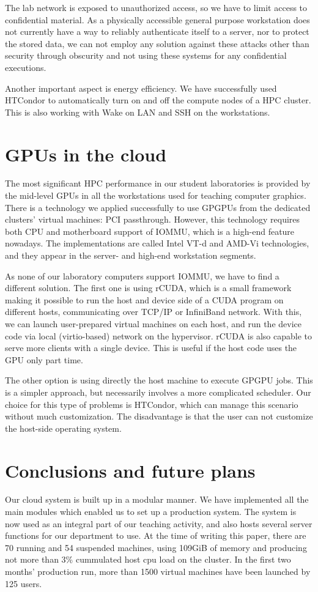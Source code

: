 \documentclass{llncs}
\begin{document}
The lab network is exposed to unauthorized access, so we have to limit access to confidential material. As a physically accessible general purpose workstation does not currently have a way to reliably authenticate itself to a server, nor to protect the stored data, we can not employ any solution against these attacks other than security through obscurity and not using these systems for any confidential executions.

Another important aspect is energy efficiency. We have successfully used HTCondor to automatically turn on and off the compute nodes of a HPC cluster. This is also working with Wake on LAN and SSH on the workstations.

\section{GPUs in the cloud}
The most significant HPC performance in our student laboratories is provided by the mid-level GPUs in all the workstations used for teaching computer graphics. There is a technology we applied successfully to use GPGPUs from the dedicated clusters' virtual machines: PCI passthrough.\cite{yang2012implementation} However, this technology requires both CPU and motherboard support of IOMMU, which is a high-end feature nowadays. The implementations are called Intel VT-d and AMD-Vi technologies, and they appear in the server- and high-end workstation segments.

As none of our laboratory computers support IOMMU, we have to find a different solution. The first one is using rCUDA, which is a small framework making it possible to run the host and device side of a CUDA program on different hosts, communicating over TCP/IP or InfiniBand network.\cite{duato2011enabling} With this, we can launch user-prepared virtual machines on each host, and run the device code via local (virtio-based) network on the hypervisor. rCUDA is also capable to serve more clients with a single device. This is useful if the host code uses the GPU only part time.

The other option is using directly the host machine to execute GPGPU jobs. This is a simpler approach, but necessarily involves a more complicated scheduler. Our choice for this type of problems is HTCondor, which can manage this scenario without much customization. The disadvantage is that the user can not customize the host-side operating system.



\section{Conclusions and future plans}
Our cloud system is built up in a modular manner. We have implemented all the main modules which enabled us to set up a production system. The system is now used as an integral part of our teaching activity, and also hosts several server functions for our department to use. At the time of writing this paper, there are 70 running and 54 suspended machines, using 109GiB of memory and producing not more than 3{\%} cummulated host cpu load on the cluster. In the first two months' production run, more than 1500 virtual machines have been launched by 125 users.
\end{document}
